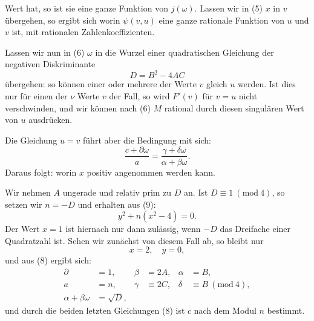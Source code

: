 Wert hat, so ist sie eine ganze Funktion von $j(\omega)$. Lassen
wir in (5) $x$ in $v$ übergehen, so ergibt sich
worin $\psi(v,u)$ eine ganze rationale Funktion von $u$ und $v$
ist, mit rationalen Zahlenkoeffizienten.

Lassen wir nun in (6) $\omega$ in die Wurzel einer quadratischen
Gleichung der negativen Diskriminante
\[
D = B^2 - 4AC
\]
übergehen:
so können einer oder mehrere der Werte $v$ gleich $u$ werden. Ist
dies nur für einen der $\nu$ Werte $v$ der Fall, so wird $F'(v)$ für
$v = u$ nicht verschwinden, und wir können nach (6) $M$ rational
durch diesen singulären Wert von $u$ ausdrücken.

Die Gleichung $u = v$ führt aber die Bedingung mit sich:
\[
\frac{c+\partial\omega}{a} = \frac{\gamma+\delta\omega}{\alpha+\beta\omega}.
\]
Daraus folgt:
worin $x$ positiv angenommen werden kann.

Wir nehmen $A$ ungerade und relativ prim zu $D$ an. Ist
$D \equiv 1\ (\mathrm{mod}\ 4)$, so setzen wir $n = -D$ und erhalten aus (9):
\[
y^2 + n(x^2-4) = 0.
\]
Der Wert $x=1$ ist hiernach nur dann zulässig, wenn $-D$
das Dreifache einer Quadratzahl ist. Sehen wir zunächst von
diesem Fall ab, so bleibt nur
\[
x = 2, \quad y = 0,
\]
und aus (8) ergibt sich:
\[
\begin{aligned}
\partial &= 1, & \beta &= 2A, & \alpha &= B,\\
a &= n, & \gamma &\equiv 2C, & \delta &\equiv B\ (\mathrm{mod}\ 4),\\
\alpha + \beta\omega &= \sqrt{D}, &&&&
\end{aligned}
\]
und durch die beiden letzten Gleichungen (8) ist $c$ nach dem
Modul $n$ bestimmt.
